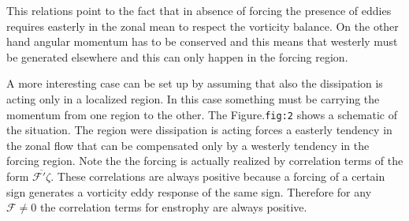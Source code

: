 This relations point to the fact that in absence of forcing the presence
of eddies requires easterly in the zonal mean to respect the vorticity
balance. On the other hand angular momentum has to be conserved and this
means that westerly must be generated elsewhere and this can only happen
in the forcing region.

A more interesting case can be set up by assuming that also the
dissipation is acting only in a localized region. In this case something
must be carrying the momentum from one region to the other. The
Figure.\texttt{fig:2} shows a schematic of the situation. The region
were dissipation is acting forces a easterly tendency in the zonal flow
that can be compensated only by a westerly tendency in the forcing
region. Note the the forcing is actually realized by correlation terms
of the form \(\overline{\mathcal{F}'\zeta}\). These correlations are
always positive because a forcing of a certain sign generates a
vorticity eddy response of the same sign. Therefore for any
\(\mathcal{F} \neq 0\) the correlation terms for enstrophy are always
positive.

